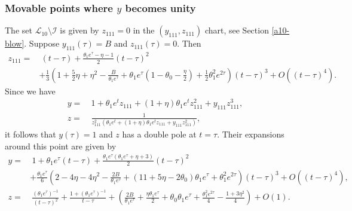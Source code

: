 \subsubsection*{Movable points where $y$ becomes unity} The set $\mathcal{L}_{10}\setminus\mathcal{I}$ is given by $z_{111}=0$ in the $(y_{111},z_{111})$ chart, see Section \ref{a10-blow}.
Suppose $y_{111}(\tau)=B$ and $z_{111}(\tau)=0$.
Then
\[
\begin{split}
z_{111}=&\ (t-\tau)+\frac{\theta_1 e^{\tau}-\eta-1}{2}(t-\tau)^2
\\&
+\frac13\left(
1+\frac52\eta+\eta^2-\frac{B}{\theta_1 e^{\tau}}+\theta_1e^{\tau}\left(1-\theta_0-\frac{\eta}2\right)+\frac12\theta_1^2e^{2\tau}
\right)(t-\tau)^3%
 +O((t-\tau)^4).
\end{split}
\]
Since we have
$$
\begin{aligned}
y =&\ 1 + \theta_1 e^t z_{111} + (1+\eta)\theta_1 e^t z_{111}^2 + y_{111} z_{111}^3,
\\
z =&\ \frac{1}{ z_{111}^2 (\theta_1 e^t + (1+\eta)\theta_1 e^t z_{111} + y_{111} z_{111}^2)},
\end{aligned}
$$
it follows that $y(\tau)=1$ and $z$ has a double pole at $t=\tau$.
Their expansions around this point are given by
\[
\begin{split}
y=&\ 1+\theta_1e^{\tau}(t-\tau)+\frac{\theta_1e^{\tau}(\theta_1 e^{\tau}+\eta+3)}{2}(t-\tau)^2
\\
&+\frac{\theta_1e^{\tau}}{6}\left(
2 - 4 \eta - 4 \eta^2 - \frac{2 B}{\theta_1 e^{\tau}} + (11 +  5 \eta- 2 \theta_0)\theta_1 e^{\tau}
 + \theta_1^2e^{2\tau}
\right)(t-\tau)^3%
+O((t-\tau)^4),
\\
z=&\ \frac{(\theta_1 e^{\tau})^{-1}}{(t-\tau)^2}+\frac{1+(\theta_1e^{\tau})^{-1}}{t-\tau}
+ \left(\frac{2 B}{\theta_1 e^{\tau}} + \frac{\eta \theta_1 e^{\tau}}{2}+ \theta_0 \theta_1 e^{\tau} 
+ \frac{\theta_1^2 e^{2\tau}}{4} - \frac{1+3 \eta^2}{4} \right)%
+O(1).
\end{split}
\]



















